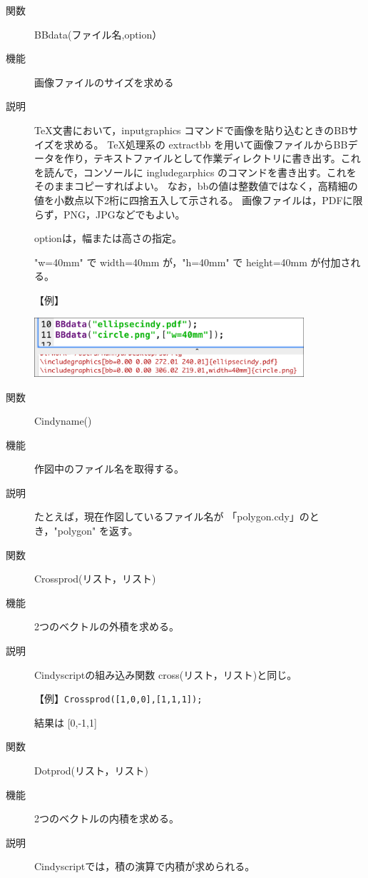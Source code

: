 \documentclass[papersize,a4paper,12pt,uplatex]{jsarticle}
\begin{document}
\begin{description}
\hypertarget{bbdata}{}
\item[関数]  BBdata(ファイル名,option）
\item[機能]  画像ファイルのサイズを求める
\item[説明]  TeX文書において，inputgraphics コマンドで画像を貼り込むときのBBサイズを求める。
TeX処理系の extractbb を用いて画像ファイルからBBデータを作り，テキストファイルとして作業ディレクトリに書き出す。これを読んで，コンソールに ingludegarphics のコマンドを書き出す。これをそのままコピーすればよい。 なお，bbの値は整数値ではなく，高精細の値を小数点以下2桁に四捨五入して示される。  画像ファイルは，PDFに限らず，PNG，JPGなどでもよい。
  
optionは，幅または高さの指定。

"w=40mm" で  width=40mm が，"h=40mm"  で height=40mm が付加される。

\vspace{\baselineskip}
【例】

\vspace{\baselineskip}
\includegraphics[bb=0.00 0.00 562.03 124.01,width=10cm]{Fig/bbdata.pdf} 


\vspace{\baselineskip}
\hypertarget{cindyname}{}
\item[関数]  Cindyname()
\item[機能]  作図中のファイル名を取得する。
\item[説明]  たとえば，現在作図しているファイル名が 「polygon.cdy」のとき，"polygon" を返す。
    
\vspace{\baselineskip}
\hypertarget{crossprod}{}
\item[関数]  Crossprod(リスト，リスト)
\item[機能]  2つのベクトルの外積を求める。
\item[説明]  Cindyscriptの組み込み関数 cross(リスト，リスト)と同じ。

\vspace{\baselineskip}
【例】\verb|Crossprod([1,0,0],[1,1,1]);|
  
      結果は  [0,-1,1]\\

\vspace{\baselineskip}
\hypertarget{dotprod}{}
\item[関数]  Dotprod(リスト，リスト)
\item[機能]  2つのベクトルの内積を求める。
\item[説明]  Cindyscriptでは，積の演算で内積が求められる。


\end{description}
\end{document}
